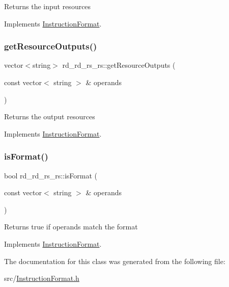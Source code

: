 Returns the input resources 

Implements \hyperlink{classInstructionFormat_a09775d3a3c22f40a0f44504664e586e4}{Instruction\+Format}.

\mbox{\label{classrd__rd__rs__rs_a7e666988b9c7ff5fb02074575311516c}} 
\subsubsection{\texorpdfstring{get\+Resource\+Outputs()}{getResourceOutputs()}}
{\footnotesize\ttfamily vector$<$string$>$ rd\+\_\+rd\+\_\+rs\+\_\+rs\+::get\+Resource\+Outputs (\begin{DoxyParamCaption}\item[{const vector$<$ string $>$ \&}]{operands }\end{DoxyParamCaption})\hspace{0.3cm}{\ttfamily [virtual]}}

Returns the output resources 

Implements \hyperlink{classInstructionFormat_a95cd28ffb1bde59b67f676880ab10536}{Instruction\+Format}.

\mbox{\label{classrd__rd__rs__rs_a66f9df0e42a4e8fd37d4182a22321602}} 
\subsubsection{\texorpdfstring{is\+Format()}{isFormat()}}
{\footnotesize\ttfamily bool rd\+\_\+rd\+\_\+rs\+\_\+rs\+::is\+Format (\begin{DoxyParamCaption}\item[{const vector$<$ string $>$ \&}]{operands }\end{DoxyParamCaption})\hspace{0.3cm}{\ttfamily [virtual]}}

Returns true if operands match the format 

Implements \hyperlink{classInstructionFormat_a9fdcf94dcd7d9a55ba86e7a63f04d1fe}{Instruction\+Format}.



The documentation for this class was generated from the following file\+:\begin{DoxyCompactItemize}
\item 
src/\hyperlink{InstructionFormat_8h}{Instruction\+Format.\+h}\end{DoxyCompactItemize}
